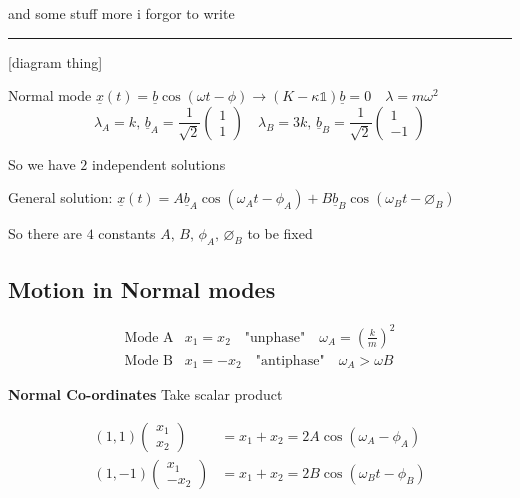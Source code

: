 \documentclass{article}
\begin{document}
and some stuff more i forgor to write

\noindent\rule{\textwidth}{0.2pt}

[diagram thing]

Normal mode $\underline{x}(t) = \underline{b}\cos(\omega t - \phi)\to (K - \kappa \mathbb{1})\underline{b} = 0 \quad \lambda = m \omega^{2}$
\[\lambda_{A} = k,\, \underline{b}_{A} = \frac{1}{\sqrt{2}}\begin{pmatrix}
    1\\
    1
\end{pmatrix} \quad \lambda_{B} = 3k,\, \underline{b}_{B} = \frac{1}{\sqrt{2}}\begin{pmatrix}
    1\\
    -1
\end{pmatrix}\]

So we have $2$ independent solutions 

General solution: $\underline{x}(t) = A \underline{b}_{A} \cos(\omega_{A} t - \phi_{A}) + B \underline{b}_{B}\cos(\omega_{B}t - \varnothing_{B})$

So there are $4$ constants $A,\,B,\,\phi_{A},\,\varnothing_{B}$ to be fixed


\subsection{Motion in Normal modes}

\begin{align*}
    \text{Mode A} & x_{1} = x_{2} \quad \text{"unphase"} \quad \omega_{A} = \left(\frac{k}{m}\right)^{2} \\
    \text{Mode B} & x_{1} = -x_{2} \quad \text{"antiphase"} \quad \omega_{A} > \omega{B}
\end{align*}

\textbf{Normal Co-ordinates}
Take scalar product

\begin{align*}
    (1, 1) \begin{pmatrix}
    x_{1} \\
    x_{2}
\end{pmatrix} &= x_{1} + x_{2} = 2A\cos(\omega_{A} - \phi_{A}) \\
    (1, -1) \begin{pmatrix}
    x_{1} \\
    -x_{2}
\end{pmatrix} &= x_{1} + x_{2} = 2B\cos(\omega_{B}t - \phi_{B}) \\
\end{align*}
\end{document}
